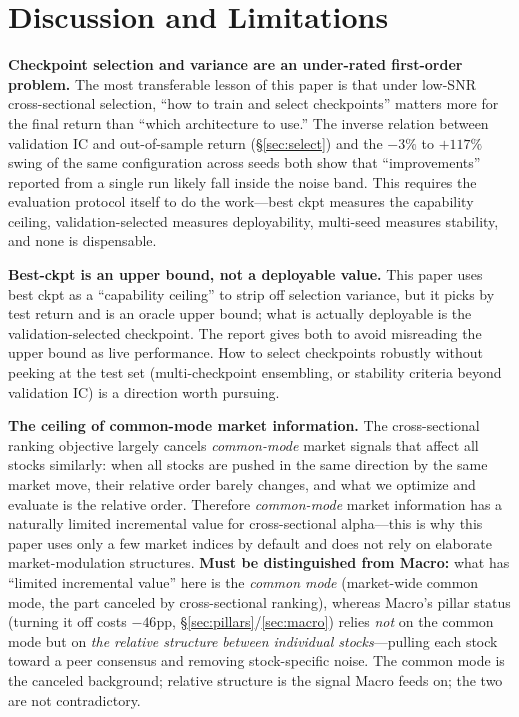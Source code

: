 \documentclass[a4paper,11pt]{article}
\begin{document}
\section{Discussion and Limitations}\label{sec:discuss}
\textbf{Checkpoint selection and variance are an under-rated
first-order problem.} The most transferable lesson of this paper is that under
low-SNR cross-sectional selection, ``how to train and select checkpoints''
matters more for the final return than ``which architecture to use.'' The
inverse relation between validation IC and out-of-sample return
(\S\ref{sec:select}) and the $-3\%$ to $+117\%$ swing of the same configuration
across seeds both show that ``improvements'' reported from a single run likely
fall inside the noise band. This requires the evaluation protocol itself to do
the work---best ckpt measures the capability ceiling, validation-selected
measures deployability, multi-seed measures stability, and none is dispensable.

\textbf{Best-ckpt is an upper bound, not a deployable value.} This paper
uses best ckpt as a ``capability ceiling'' to strip off selection variance, but
it picks by test return and is an oracle upper bound; what is actually
deployable is the validation-selected checkpoint. The report gives both to avoid
misreading the upper bound as live performance. How to select checkpoints
robustly without peeking at the test set (multi-checkpoint ensembling, or
stability criteria beyond validation IC) is a direction worth pursuing.

\textbf{The ceiling of common-mode market information.} The
cross-sectional ranking objective largely cancels \emph{common-mode} market
signals that affect all stocks similarly: when all stocks are pushed in the
same direction by the same market move, their relative order barely changes,
and what we optimize and evaluate is the relative order. Therefore
\emph{common-mode} market information has a naturally limited incremental value
for cross-sectional alpha---this is why this paper uses only a few market
indices by default and does not rely on elaborate market-modulation structures.
\textbf{Must be distinguished from Macro:} what has ``limited
incremental value'' here is the \emph{common mode} (market-wide common mode,
the part canceled by cross-sectional ranking), whereas Macro's pillar status
(turning it off costs $-46$pp, \S\ref{sec:pillars}/\ref{sec:macro}) relies
\emph{not} on the common mode but on \emph{the relative structure between
individual stocks}---pulling each stock toward a peer consensus and removing
stock-specific noise. The common mode is the canceled background; relative
structure is the signal Macro feeds on; the two are not contradictory.
\end{document}

